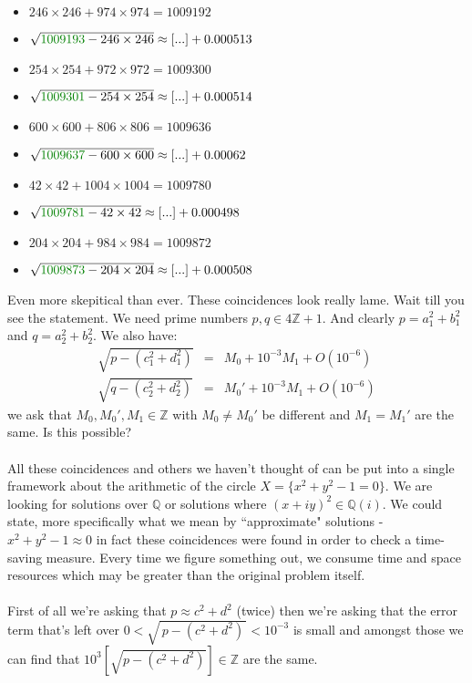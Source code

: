 \documentclass[12pt]{article}
\begin{document}
\begin{multicols}{2}
\begin{itemize}
\item $246×246 + 974×974 = 1009192$
\item $\sqrt{ {\color{green!50!black}{1009193}} - 246\times 246 } \approx [...] + 0.000513$
\item $254×254 + 972×972 = 1009300$
\item $\sqrt{ {\color{green!50!black}{1009301}} - 254\times 254 } \approx [...] + 0.000514$
\item $600×600 + 806×806 = 1009636$
\item $\sqrt{ {\color{green!50!black}{1009637}} - 600\times 600 } \approx [...] + 0.00062$
\item $42×42 + 1004×1004 = 1009780$
\item $\sqrt{ {\color{green!50!black}{1009781}} - 42\times 42 } \approx [...] + 0.000498$
\item $204×204 + 984×984 = 1009872$
\item $\sqrt{ {\color{green!50!black}{1009873}} - 204\times 204 } \approx [...] + 0.000508$
\end{itemize}
\end{multicols}
\noindent Even more skepitical than ever.  These coincidences look really lame.  Wait till you see the statement.  We need prime numbers $p, q \in 4\mathbb{Z}+1$.  And clearly $p = a_1^2 + b_1^2$ and $q = a_2^2 + b_2^2$.  We also have:
\begin{eqnarray*}
 \sqrt{ p - (c_1^2 + d_1^2)}&=& M_0  + 10^{-3}M_1 + O(10^{-6})\\
 \sqrt{ q - (c_2^2 + d_2^2)}&=& M_0' + 10^{-3}M_1 + O(10^{-6})
\end{eqnarray*}
we ask that $M_0, M_0', M_1 \in \mathbb{Z}$ with $M_0 \neq M_0'$ be different and $M_1 = M_1'$ are the same. Is this possible?  \\ \\
All these coincidences and others we haven't thought of can be put into a single framework about the arithmetic of the circle $X = \{ x^2 + y^2 - 1 = 0\}$. We are looking for solutions over $\mathbb{Q}$ or solutions where $(x + iy)^2 \in \mathbb{Q}(i)$. We could state, more specifically what we mean by ``approximate" solutions -  $x^2 + y^2 - 1 \approx 0$ in fact these coincidences were found in order to check a time-saving measure.  Every time we figure something out, we consume time and space resources which may be greater than the original problem itself. \\ \\
First of all we're asking that $p \approx c^2 + d^2$ (twice) then we're asking that the error term that's left over $0 < \sqrt{ \, p - (c^2 + d^2)\,} < 10^{-3}$ is small and amongst those we can find that $10^3 [ \sqrt{ p - (c^2 + d^2)}] \in \mathbb{Z}$ are the same.  \\ \\
\end{document}
